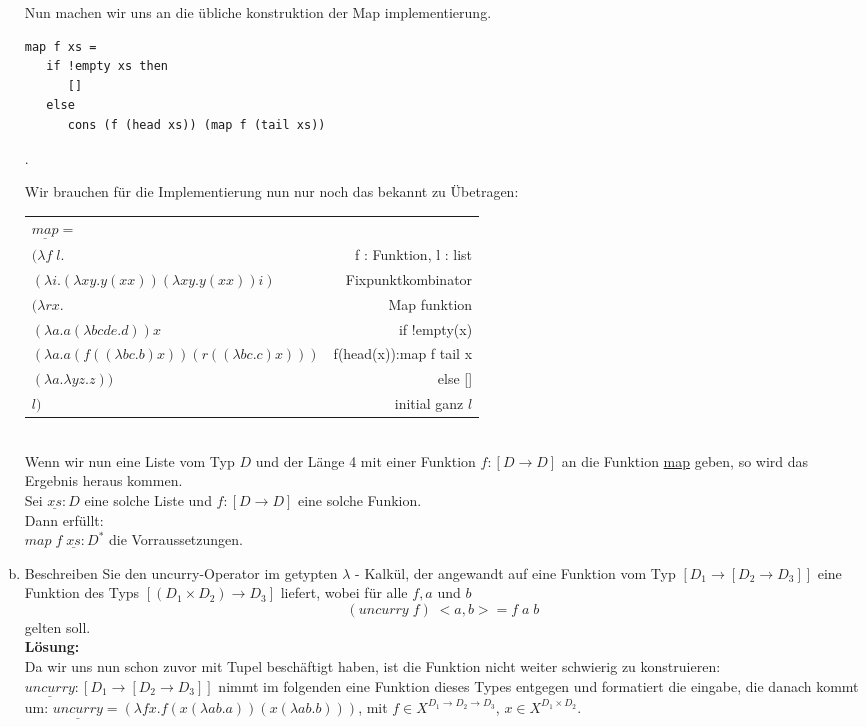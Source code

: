 \documentclass[11pt,a4paper,ngerman]{article}
\begin{document}
\begin{enumerate}[(a)]
      Nun machen wir uns an die übliche konstruktion der Map implementierung.
      \begin{lstlisting}
map f xs =
   if !empty xs then
      []
   else
      cons (f (head xs)) (map f (tail xs))
      \end{lstlisting}.

      Wir brauchen für die Implementierung nun nur noch das bekannt zu Übetragen:\\
      \begin{tabular}{lr}
         $\underline{map} =$ &\\
         $ (\lambda f \; l.$& f : Funktion, l : list\\
         $(\lambda i.(\lambda xy.y(xx)) (\lambda xy.y(xx)) i)$& Fixpunktkombinator\\   
         $(\lambda rx.$&Map funktion\\
         $(\lambda a.a(\lambda bcde.d))x$& if !empty(x)\\
         $(\lambda a.a (f((\lambda bc.b)x)) (r((\lambda bc.c)x)))$& f(head(x)):map f tail x\\
         $(\lambda a. \lambda yz.z))$& else []\\
         $l)$& initial ganz $l$
      \end{tabular}\\
      
      Wenn wir nun eine Liste vom Typ $D$ und der Länge 4 mit einer Funktion $f:[D\rightarrow D]$
      an die Funktion \underline{map} geben, so wird das Ergebnis heraus kommen.\\

      Sei $\underline{xs} : D$ eine solche Liste und $f : [D \rightarrow D]$ eine solche Funkion.\\
      Dann erfüllt:\\
      $map \;f\; \underline{xs} : D^*$ die Vorraussetzungen.

\pagebreak

	\item Beschreiben Sie den uncurry-Operator im getypten $\lambda$ - Kalkül, der angewandt
      auf eine Funktion vom Typ $[D_1 \rightarrow [D_2 \rightarrow D_3]]$ eine Funktion des
      Typs $[(D_1 \times D_2) \rightarrow D_3]$ liefert, wobei für alle $f, a$ und $b$
      $$
         (uncurry\; f) \;<a,b> = f \; a \; b 
      $$
      gelten soll.\\
   \textbf{Lösung:}\\
      Da wir uns nun schon zuvor mit Tupel beschäftigt haben, ist die Funktion nicht weiter
      schwierig zu konstruieren:
      $\underline{uncurry} : [D_1 \rightarrow [D_2 \rightarrow D_3]]$
      nimmt im folgenden eine Funktion dieses Types entgegen und formatiert die eingabe,
      die danach kommt um:
      $\underline{uncurry} = (\lambda fx.f (x (\lambda ab.a)) (x (\lambda ab.b)))$,
      mit $f \in X^{D_1 \rightarrow D_2 \rightarrow D_3}$, $x \in X^{D_1 \times D_2}$.\\


\end{enumerate}
\end{document}
